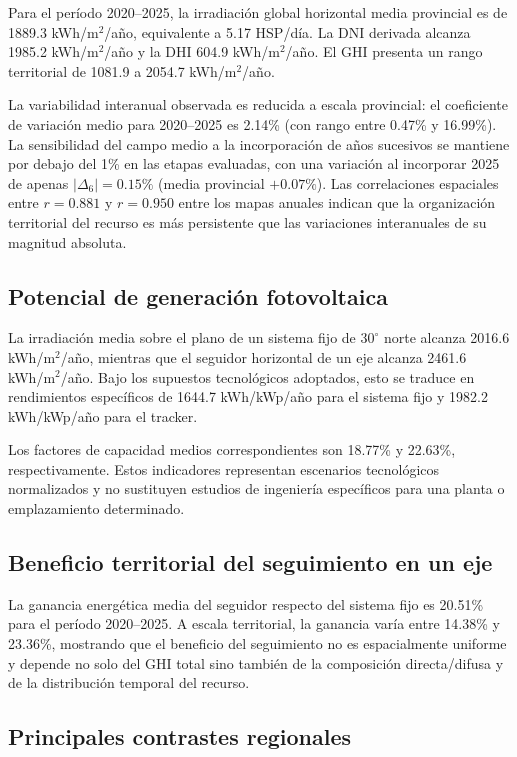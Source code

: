 \documentclass[11pt,a4paper]{article}
\begin{document}
Para el período 2020--2025, la irradiación global horizontal media provincial es de 1889.3 kWh/m$^2$/año, equivalente a 5.17 HSP/día. La DNI derivada alcanza 1985.2 kWh/m$^2$/año y la DHI 604.9 kWh/m$^2$/año. El GHI presenta un rango territorial de 1081.9 a 2054.7 kWh/m$^2$/año.

La variabilidad interanual observada es reducida a escala provincial: el coeficiente de variación medio para 2020--2025 es 2.14\% (con rango entre 0.47\% y 16.99\%). La sensibilidad del campo medio a la incorporación de años sucesivos se mantiene por debajo del 1\% en las etapas evaluadas, con una variación al incorporar 2025 de apenas $|\Delta_6|=0.15\%$ (media provincial $+0.07\%$). Las correlaciones espaciales entre $r=0.881$ y $r=0.950$ entre los mapas anuales indican que la organización territorial del recurso es más persistente que las variaciones interanuales de su magnitud absoluta.

\subsection{Potencial de generación fotovoltaica}

La irradiación media sobre el plano de un sistema fijo de $30^\circ$ norte alcanza 2016.6 kWh/m$^2$/año, mientras que el seguidor horizontal de un eje alcanza 2461.6 kWh/m$^2$/año. Bajo los supuestos tecnológicos adoptados, esto se traduce en rendimientos específicos de 1644.7 kWh/kWp/año para el sistema fijo y 1982.2 kWh/kWp/año para el tracker.

Los factores de capacidad medios correspondientes son 18.77\% y 22.63\%, respectivamente. Estos indicadores representan escenarios tecnológicos normalizados y no sustituyen estudios de ingeniería específicos para una planta o emplazamiento determinado.

\subsection{Beneficio territorial del seguimiento en un eje}

La ganancia energética media del seguidor respecto del sistema fijo es 20.51\% para el período 2020--2025. A escala territorial, la ganancia varía entre 14.38\% y 23.36\%, mostrando que el beneficio del seguimiento no es espacialmente uniforme y depende no solo del GHI total sino también de la composición directa/difusa y de la distribución temporal del recurso.

\subsection{Principales contrastes regionales}
\end{document}
